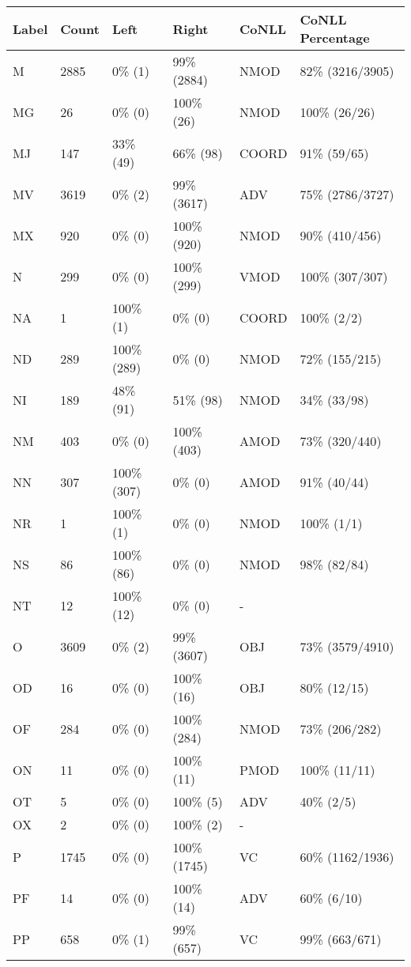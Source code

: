 \begin{figure*}
\begin{tabular}{|l|l|l|l||l|l|}
\hline
Label & Count & Left & Right & CoNLL & CoNLL Percentage\\ 
\hline
 M & 2885 & 0\% (1) & 99\% (2884) & NMOD & 82\% (3216/3905) \\ 
\hline
 MG & 26 & 0\% (0) & 100\% (26) & NMOD & 100\% (26/26) \\ 
\hline
 MJ & 147 & 33\% (49) & 66\% (98) & COORD & 91\% (59/65) \\ 
\hline
 MV & 3619 & 0\% (2) & 99\% (3617) & ADV & 75\% (2786/3727) \\ 
\hline
 MX & 920 & 0\% (0) & 100\% (920) & NMOD & 90\% (410/456) \\ 
\hline
 N & 299 & 0\% (0) & 100\% (299) & VMOD & 100\% (307/307) \\ 
\hline
 NA & 1 & 100\% (1) & 0\% (0) & COORD & 100\% (2/2) \\ 
\hline
 ND & 289 & 100\% (289) & 0\% (0) & NMOD & 72\% (155/215) \\ 
\hline
 NI & 189 & 48\% (91) & 51\% (98) & NMOD & 34\% (33/98) \\ 
\hline
 NM & 403 & 0\% (0) & 100\% (403) & AMOD & 73\% (320/440) \\ 
\hline
 NN & 307 & 100\% (307) & 0\% (0) & AMOD & 91\% (40/44) \\ 
\hline
 NR & 1 & 100\% (1) & 0\% (0) & NMOD & 100\% (1/1) \\ 
\hline
 NS & 86 & 100\% (86) & 0\% (0) & NMOD & 98\% (82/84) \\ 
\hline
 NT & 12 & 100\% (12) & 0\% (0) & - &  \\ 
\hline
 O & 3609 & 0\% (2) & 99\% (3607) & OBJ & 73\% (3579/4910) \\ 
\hline
 OD & 16 & 0\% (0) & 100\% (16) & OBJ & 80\% (12/15) \\ 
\hline
 OF & 284 & 0\% (0) & 100\% (284) & NMOD & 73\% (206/282) \\ 
\hline
 ON & 11 & 0\% (0) & 100\% (11) & PMOD & 100\% (11/11) \\ 
\hline
 OT & 5 & 0\% (0) & 100\% (5) & ADV & 40\% (2/5) \\ 
\hline
 OX & 2 & 0\% (0) & 100\% (2) & - &  \\ 
\hline
 P & 1745 & 0\% (0) & 100\% (1745) & VC & 60\% (1162/1936) \\ 
\hline
 PF & 14 & 0\% (0) & 100\% (14) & ADV & 60\% (6/10) \\ 
\hline
 PP & 658 & 0\% (1) & 99\% (657) & VC & 99\% (663/671) \\ 

\end{tabular}
\end{figure*}

